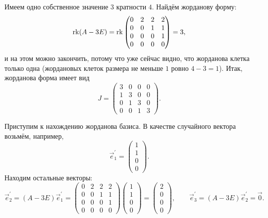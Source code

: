\begin{solution}
	Имеем одно собственное значение $3$ кратности $4$. Найдём жорданову форму:
	\begin{gather*}
		\operatorname{rk}(A - 3E) = \operatorname{rk}
		\begin{pmatrix}
			0 & 2 & 2 & 2\\
			0 & 0 & 1 & 1\\
			0 & 0 & 0 & 1\\
			0 & 0 & 0 & 0
		\end{pmatrix} = 3,
	\end{gather*}
	и на этом можно закончить, потому что уже сейчас видно, что жорданова клетка только одна (жордановых клеток размера не меньше $1$ ровно $4 - 3 = 1$). Итак, жорданова форма имеет вид
	\[
		J =
		\begin{pmatrix}
			3 & 0 & 0 & 0\\
			1 & 3 & 0 & 0\\
			0 & 1 & 3 & 0\\
			0 & 0 & 1 & 3
		\end{pmatrix}.
	\]

	Приступим к нахождению жорданова базиса. В качестве случайного вектора возьмём, например,
	\[
		\vec{e}^\prime_1 =
		\begin{pmatrix}
			1\\
			1\\
			0\\
			0
		\end{pmatrix}.
	\]
	Находим остальные векторы:
	\[
		\vec{e}^\prime_2 = (A - 3E)\vec{e}^\prime_1 = 
		\begin{pmatrix}
			0 & 2 & 2 & 2\\
			0 & 0 & 1 & 1\\
			0 & 0 & 0 & 1\\
			0 & 0 & 0 & 0
		\end{pmatrix}
		\begin{pmatrix}
			1\\
			1\\
			0\\
			0
		\end{pmatrix} =
		\begin{pmatrix}
			2\\
			0\\
			0\\
			0
		\end{pmatrix},\qquad
		\vec{e}^\prime_3 = (A - 3E)\vec{e}^\prime_2 = \vec{0}.
	\]


\end{solution}
